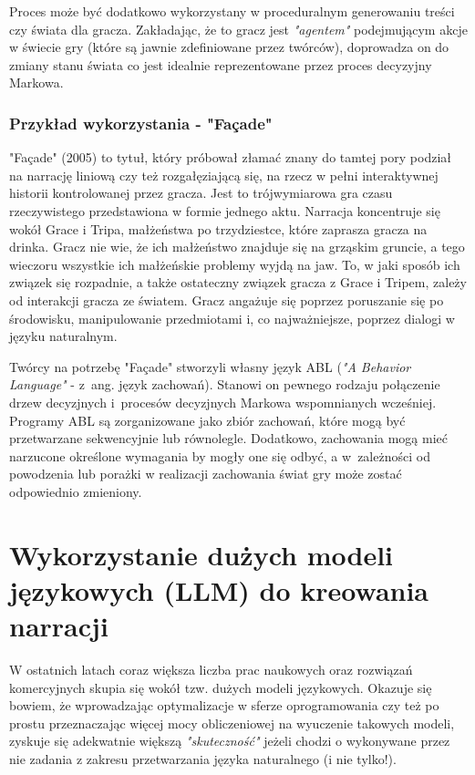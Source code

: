 Proces może być dodatkowo wykorzystany w proceduralnym generowaniu treści czy świata dla gracza.
Zakładając, że to gracz jest \textit{"agentem"} podejmującym akcje w świecie gry (które są jawnie
zdefiniowane przez twórców), doprowadza on do zmiany stanu świata co jest idealnie reprezentowane
przez proces decyzyjny Markowa\cite{automated_planning}.

\subsubsection*{Przykład wykorzystania - "Façade"}

"Façade" (2005) to tytuł, który próbował złamać znany do tamtej pory podział na narrację liniową czy też
rozgałęziającą się, na rzecz w pełni interaktywnej historii kontrolowanej przez gracza. Jest to
trójwymiarowa gra czasu rzeczywistego przedstawiona w formie jednego aktu. Narracja koncentruje się
wokół Grace i Tripa, małżeństwa po trzydziestce, które zaprasza gracza na drinka. Gracz nie wie, że ich
małżeństwo znajduje się na grząskim gruncie, a tego wieczoru wszystkie ich małżeńskie problemy wyjdą na
jaw. To, w jaki sposób ich związek się rozpadnie, a także ostateczny związek gracza z Grace i Tripem,
zależy od interakcji gracza ze światem. Gracz angażuje się poprzez poruszanie się po środowisku,
manipulowanie przedmiotami i, co najważniejsze, poprzez dialogi w języku naturalnym\cite{1024751}.

Twórcy na potrzebę "Façade" stworzyli własny język ABL (\textit{"A Behavior Language"} - z~ang. język
zachowań). Stanowi on pewnego rodzaju połączenie drzew decyzjnych i~procesów decyzjnych Markowa
wspomnianych wcześniej. Programy ABL są zorganizowane jako zbiór zachowań, które mogą być przetwarzane
sekwencyjnie lub równolegle. Dodatkowo, zachowania mogą mieć narzucone określone wymagania by
mogły one się odbyć, a w~zależności od powodzenia lub porażki w realizacji zachowania świat gry
może zostać odpowiednio zmieniony.

\section{Wykorzystanie dużych modeli językowych (LLM) do kreowania narracji}\label{section:ch4_2}

W ostatnich latach coraz większa liczba prac naukowych oraz rozwiązań komercyjnych skupia się wokół
tzw. dużych modeli językowych. Okazuje się bowiem, że wprowadzając optymalizacje w sferze oprogramowania
czy też po prostu przeznaczając więcej mocy obliczeniowej na wyuczenie takowych modeli, zyskuje się
adekwatnie większą \textit{"skuteczność"} jeżeli chodzi o wykonywane przez nie zadania z zakresu
przetwarzania języka naturalnego (i nie tylko!).

